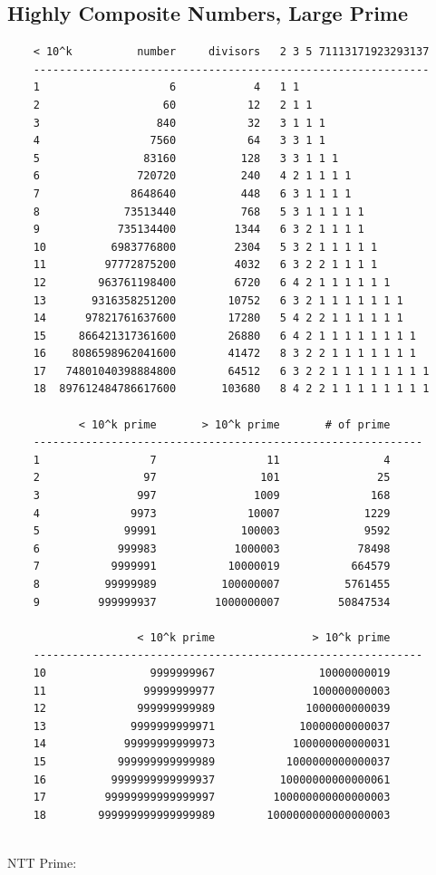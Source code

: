 \documentclass[landscape, 8pt, a4paper, oneside, twocolumn]{extarticle}
\begin{document}
\subsection {Highly Composite Numbers, Large Prime}
\begin{verbatim}
	< 10^k          number     divisors   2 3 5 71113171923293137
	-------------------------------------------------------------
	1                    6            4   1 1
	2                   60           12   2 1 1
	3                  840           32   3 1 1 1
	4                 7560           64   3 3 1 1
	5                83160          128   3 3 1 1 1
	6               720720          240   4 2 1 1 1 1
	7              8648640          448   6 3 1 1 1 1
	8             73513440          768   5 3 1 1 1 1 1
	9            735134400         1344   6 3 2 1 1 1 1
	10          6983776800         2304   5 3 2 1 1 1 1 1
	11         97772875200         4032   6 3 2 2 1 1 1 1
	12        963761198400         6720   6 4 2 1 1 1 1 1 1
	13       9316358251200        10752   6 3 2 1 1 1 1 1 1 1
	14      97821761637600        17280   5 4 2 2 1 1 1 1 1 1
	15     866421317361600        26880   6 4 2 1 1 1 1 1 1 1 1
	16    8086598962041600        41472   8 3 2 2 1 1 1 1 1 1 1
	17   74801040398884800        64512   6 3 2 2 1 1 1 1 1 1 1 1
	18  897612484786617600       103680   8 4 2 2 1 1 1 1 1 1 1 1
	
	       < 10^k prime       > 10^k prime       # of prime   
	------------------------------------------------------------
	1                 7                 11                4    
	2                97                101               25    
	3               997               1009              168    
	4              9973              10007             1229    
	5             99991             100003             9592    
	6            999983            1000003            78498    
	7           9999991           10000019           664579     
	8          99999989          100000007          5761455     
	9         999999937         1000000007         50847534     
    
	                < 10^k prime               > 10^k prime
	------------------------------------------------------------
	10                9999999967                10000000019
	11               99999999977               100000000003
	12              999999999989              1000000000039
	13             9999999999971             10000000000037
	14            99999999999973            100000000000031
	15           999999999999989           1000000000000037
	16          9999999999999937          10000000000000061
	17         99999999999999997         100000000000000003
	18        999999999999999989        1000000000000000003
    
\end{verbatim}
NTT Prime:
\end{document}
